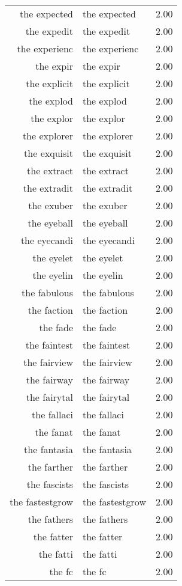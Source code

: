 \begin{table}[ht]
\begin{tabular}{rlr}
  the expected & the expected & 2.00 \\ 
  the expedit & the expedit & 2.00 \\ 
  the experienc & the experienc & 2.00 \\ 
  the expir & the expir & 2.00 \\ 
  the explicit & the explicit & 2.00 \\ 
  the explod & the explod & 2.00 \\ 
  the explor & the explor & 2.00 \\ 
  the explorer & the explorer & 2.00 \\ 
  the exquisit & the exquisit & 2.00 \\ 
  the extract & the extract & 2.00 \\ 
  the extradit & the extradit & 2.00 \\ 
  the exuber & the exuber & 2.00 \\ 
  the eyeball & the eyeball & 2.00 \\ 
  the eyecandi & the eyecandi & 2.00 \\ 
  the eyelet & the eyelet & 2.00 \\ 
  the eyelin & the eyelin & 2.00 \\ 
  the fabulous & the fabulous & 2.00 \\ 
  the faction & the faction & 2.00 \\ 
  the fade & the fade & 2.00 \\ 
  the faintest & the faintest & 2.00 \\ 
  the fairview & the fairview & 2.00 \\ 
  the fairway & the fairway & 2.00 \\ 
  the fairytal & the fairytal & 2.00 \\ 
  the fallaci & the fallaci & 2.00 \\ 
  the fanat & the fanat & 2.00 \\ 
  the fantasia & the fantasia & 2.00 \\ 
  the farther & the farther & 2.00 \\ 
  the fascists & the fascists & 2.00 \\ 
  the fastestgrow & the fastestgrow & 2.00 \\ 
  the fathers & the fathers & 2.00 \\ 
  the fatter & the fatter & 2.00 \\ 
  the fatti & the fatti & 2.00 \\ 
  the fc & the fc & 2.00 \\ 

\end{tabular}
\end{table}
